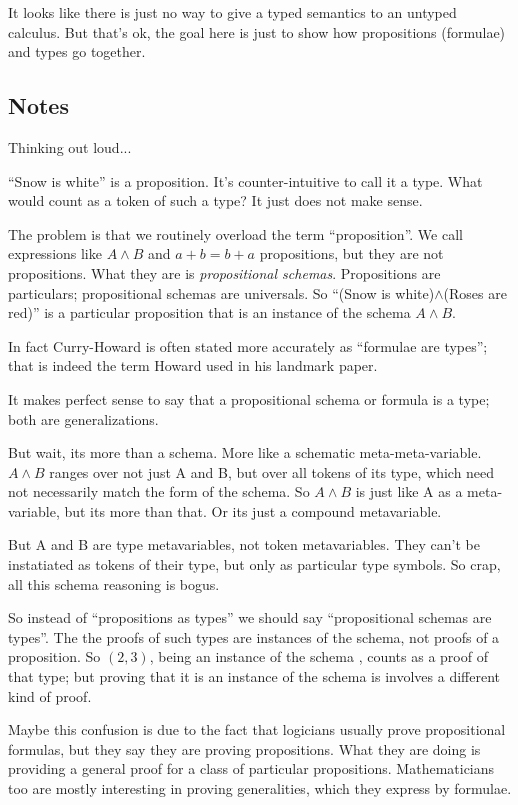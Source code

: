 \documentclass{article}
\begin{document}
It looks like there is just no way to give a typed semantics to an
untyped calculus. But that's ok, the goal here is just to show how
propositions (formulae) and types go together.


\subsection{Notes}

Thinking out loud...

``Snow is white'' is a proposition. It's counter-intuitive to call it
a type. What would count as a token of such a type? It just does not
make sense.

The problem is that we routinely overload the term ``proposition''. We
call expressions like \(A\land B\) and \(a+b=b+a\) propositions, but
they are not propositions. What they are is \textit{propositional
  schemas}. Propositions are particulars; propositional schemas are
universals. So ``(Snow is white)\(\land\)(Roses are red)'' is a
particular proposition that is an instance of the schema \(A\land B\).

In fact Curry-Howard is often stated more accurately as ``formulae are
types''; that is indeed the term Howard used in his landmark paper.

It makes perfect sense to say that a propositional schema or formula
is a type; both are generalizations.

But wait, its more than a schema. More like a schematic
meta-meta-variable. \(A\land B\) ranges over not just A and B, but
over all tokens of its type, which need not necessarily match the form
of the schema. So \(A\land B\) is just like A as a meta-variable, but
its more than that.  Or its just a compound metavariable.

But A and B are type metavariables, not token metavariables. They
can't be instatiated as tokens of their type, but only as particular
type symbols. So crap, all this schema reasoning is bogus.

So instead of ``propositions as types'' we should say ``propositional
schemas are types''. The the proofs of such types are instances of the
schema, not proofs of a proposition. So \((2,3)\), being an instance
of the schema \(\), counts as a proof of that type; but proving that
it is an instance of the schema is involves a different kind of proof.

Maybe this confusion is due to the fact that logicians usually prove
propositional formulas, but they say they are proving propositions.
What they are doing is providing a general proof for a class of
particular propositions. Mathematicians too are mostly interesting in
proving generalities, which they express by formulae.
\end{document}
